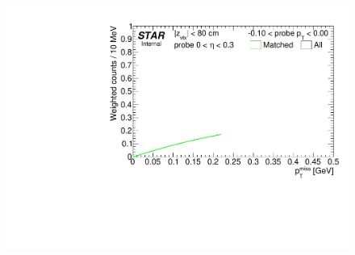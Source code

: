 \begin{figure}[h!]
{  \includegraphics[width=\linewidth,page=11]{graphics/correctionsToEff/TOF_tagAndProbe/Fitting_effVsPt_mc_ETABINS_B.CPT2.pdf}

}
\end{figure}
